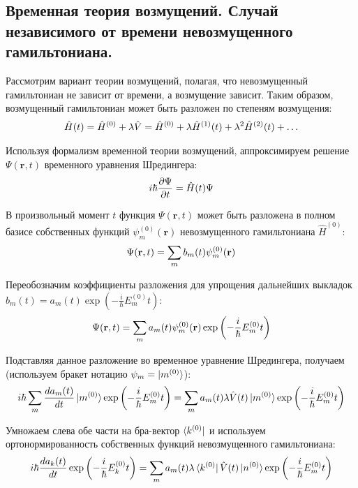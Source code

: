\documentclass[12pt]{article}
\newcommand{\lb}{\left(}
\newcommand{\rb}{\right)}
\newcommand{\mf}{\mathbf}
\newcommand{\vverh}{\vspace*{-0.15cm}}
\begin{document}
\subsection*{Временная теория возмущений. Случай независимого от времени невозмущенного гамильтониана.}

Рассмотрим вариант теории возмущений, полагая, что невозмущенный гамильтониан не зависит от времени, а возмущение зависит. Таким образом, возмущенный гамильтониан может быть разложен по степеням возмущения:
\vverh
\begin{gather}
	\hat{H}(t) = \hat{H}^{(0)} + \lambda \hat{V} = \hat{H}^{(0)} + \lambda \hat{H}^{(1)}(t) + \lambda^2 \hat{H}^{(2)}(t) + \dots \notag
\end{gather}

Используя формализм временной теории возмущений, аппроксимируем решение $\Psi(\mf{r}, t)$ временного уравнения Шредингера:
\vverh
\begin{gather}
	i \hbar \frac{\partial \Psi}{\partial t} = \hat{H}(t) \Psi \notag
\end{gather}

В произвольный момент $t$ функция $\Psi(\mf{r}, t)$ может быть разложена в полном базисе собственных функций $\psi_m^{(0)}(\mf{r})$ невозмущенного гамильтониана $\hat{H}^{(0)}$:
\vverh
\begin{gather}
	\Psi(\mf{r}, t) = \sum_m b_m(t) \psi_m^{(0)}(\mf{r}) \notag
\end{gather}

Переобозначим коэффициенты разложения для упрощения дальнейших выкладок $b_m(t) = a_m(t) \exp \lb - \frac{i}{\hbar} E_m^{(0)} t \rb$:
\vverh \vverh \vverh
\begin{gather}
	\Psi(\mf{r}, t) = \sum_m a_m(t) \psi_m^{(0)} (\mf{r}) \exp \lb - \frac{i}{\hbar} E_m^{(0)} t \rb \notag
\end{gather}

Подставляя данное разложение во временное уравнение Шредингера, получаем (используем бракет нотацию $\psi_m = \ket{m^{(0)}}$):
\vverh
\begin{gather}
	i \hbar \sum_m \frac{d a_m(t)}{dt} \ket{m^{(0)}} \exp \lb - \frac{i}{\hbar} E_m^{(0)} t \rb = \sum_m a_m(t) \lambda \hat{V}(t) \ket{m^{(0)}} \exp \lb - \frac{i}{\hbar} E_m^{(0)} t \rb \notag  
\end{gather}

Умножаем слева обе части на бра-вектор $\bra{k^{(0)}}$ и используем ортонормированность собственных функций невозмущенного гамильтониана:  
\vverh
\begin{gather}
	i \hbar \frac{d a_k(t)}{dt} \exp \lb - \frac{i}{\hbar} E_k^{(0)} t \rb = \sum_m a_m(t) \lambda \bra {k^{(0)}} \hat{V}(t) \ket{n^{(0)}} \exp \lb - \frac{i}{\hbar} E_m^{(0)} t \rb \notag 
\end{gather}
\end{document}
